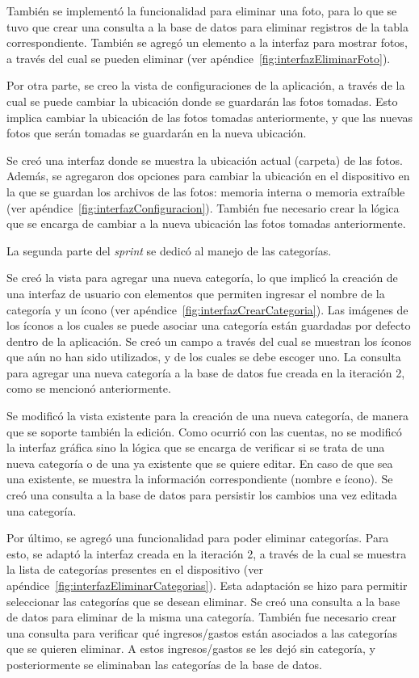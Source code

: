 También se implementó la funcionalidad para eliminar una foto, para lo que se tuvo que crear una consulta a la base de datos para eliminar registros de la tabla correspondiente. También se agregó un elemento a la interfaz para mostrar fotos, a través del cual se pueden eliminar (ver apéndice~\ref{fig:interfazEliminarFoto}).

Por otra parte, se creo la vista de configuraciones de la aplicación, a través de la cual se puede cambiar la ubicación donde se guardarán las fotos tomadas. Esto implica cambiar la ubicación de las fotos tomadas anteriormente, y que las nuevas fotos que serán tomadas se guardarán en la nueva ubicación.

Se creó una interfaz donde se muestra la ubicación actual (carpeta) de las fotos. Además, se agregaron dos opciones para cambiar la ubicación en el dispositivo en la que se guardan los archivos de las fotos: memoria interna o memoria extraíble (ver apéndice~\ref{fig:interfazConfiguracion}). También fue necesario crear la lógica que se encarga de cambiar a la nueva ubicación las fotos tomadas anteriormente.

La segunda parte del \textit{sprint} se dedicó al manejo de las categorías. 

Se creó la vista para agregar una nueva categoría, lo que implicó la creación de una interfaz de usuario con elementos que permiten ingresar el nombre de la categoría y un ícono (ver apéndice~\ref{fig:interfazCrearCategoria}). Las imágenes de los íconos a los cuales se puede asociar una categoría están guardadas por defecto dentro de la aplicación. Se creó un campo a través del cual se muestran los íconos que aún no han sido utilizados, y de los cuales se debe escoger uno. La consulta para agregar una nueva categoría a la base de datos fue creada en la iteración 2, como se mencionó anteriormente.

Se modificó la vista existente para la creación de una nueva categoría, de manera que se soporte también la edición. Como ocurrió con las cuentas, no se modificó la interfaz gráfica sino la lógica que se encarga de verificar si se trata de una nueva categoría o de una ya existente que se quiere editar. En caso de que sea una existente, se muestra la información correspondiente (nombre e ícono). Se creó una consulta a la base de datos para persistir los cambios una vez editada una categoría.

Por último, se agregó una funcionalidad para poder eliminar categorías. Para esto, se adaptó la interfaz creada en la iteración 2, a través de la cual se muestra la lista de categorías presentes en el dispositivo (ver apéndice~\ref{fig:interfazEliminarCategorias}). Esta adaptación se hizo para permitir seleccionar las categorías que se desean eliminar. Se creó una consulta a la base de datos para eliminar de la misma una categoría. También fue necesario crear una consulta para verificar qué ingresos/gastos están asociados a las categorías que se quieren eliminar. A estos ingresos/gastos se les dejó sin categoría, y posteriormente se eliminaban las categorías de la base de datos.

